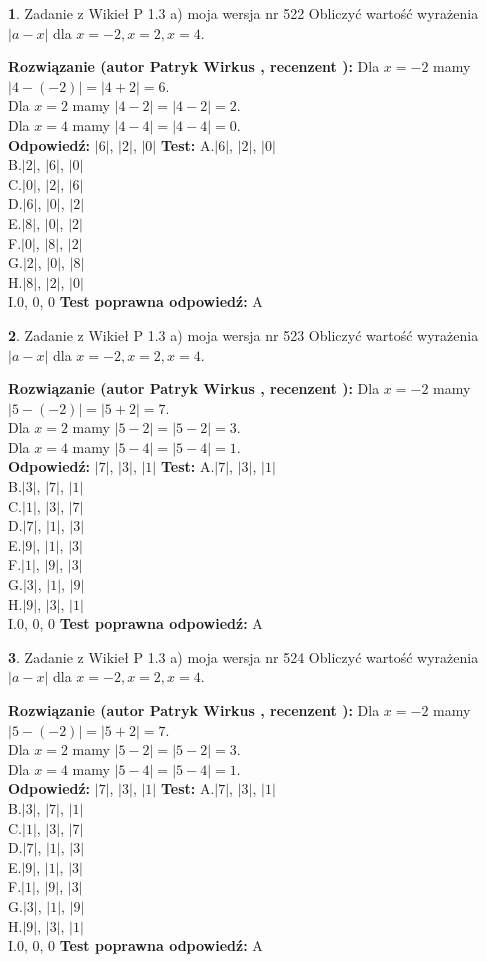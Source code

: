 \documentclass[12pt, a4paper]{article}
\theoremstyle{definition} %
\newtheorem{zad}{}
\newcommand{\zadStart}[1]{\begin{zad}#1\newline}
\newcommand{\zadStop}{\end{zad}}
\newcommand{\rozwStart}[2]{\noindent \textbf{Rozwiązanie (autor #1 , recenzent #2): }\newline}
\newcommand{\rozwStop}{\newline}
\newcommand{\odpStart}{\noindent \textbf{Odpowiedź:}\newline}
\newcommand{\odpStop}{\newline}
\newcommand{\testStart}{\noindent \textbf{Test:}\newline}
\newcommand{\testStop}{\newline}
\newcommand{\kluczStart}{\noindent \textbf{Test poprawna odpowiedź:}\newline}
\newcommand{\kluczStop}{\newline}
\begin{document}
\zadStart{Zadanie z Wikieł P 1.3 a) moja wersja nr 522}
Obliczyć wartość wyrażenia $|a - x|$ dla $x=-2,x=2,x=4$.
\zadStop
\rozwStart{Patryk Wirkus}{}
Dla $x = -2$ mamy $|4 - (-2)| = |4 + 2| = 6$.\\
Dla $x = 2$ mamy $|4 - 2| = |4 - 2| = 2$.\\
Dla $x = 4$ mamy $|4 - 4| = |4 - 4| = 0$.\\
\rozwStop
\odpStart
$|6|$, $|2|$, $|0|$
\odpStop
\testStart
A.$|6|$, $|2|$, $|0|$\\
B.$|2|$, $|6|$, $|0|$\\
C.$|0|$, $|2|$, $|6|$\\
D.$|6|$, $|0|$, $|2|$\\
E.$|8|$, $|0|$, $|2|$\\
F.$|0|$, $|8|$, $|2|$\\
G.$|2|$, $|0|$, $|8|$\\
H.$|8|$, $|2|$, $|0|$\\
I.$0$, $0$, $0$
\testStop
\kluczStart
A
\kluczStop



\zadStart{Zadanie z Wikieł P 1.3 a) moja wersja nr 523}
Obliczyć wartość wyrażenia $|a - x|$ dla $x=-2,x=2,x=4$.
\zadStop
\rozwStart{Patryk Wirkus}{}
Dla $x = -2$ mamy $|5 - (-2)| = |5 + 2| = 7$.\\
Dla $x = 2$ mamy $|5 - 2| = |5 - 2| = 3$.\\
Dla $x = 4$ mamy $|5 - 4| = |5 - 4| = 1$.\\
\rozwStop
\odpStart
$|7|$, $|3|$, $|1|$
\odpStop
\testStart
A.$|7|$, $|3|$, $|1|$\\
B.$|3|$, $|7|$, $|1|$\\
C.$|1|$, $|3|$, $|7|$\\
D.$|7|$, $|1|$, $|3|$\\
E.$|9|$, $|1|$, $|3|$\\
F.$|1|$, $|9|$, $|3|$\\
G.$|3|$, $|1|$, $|9|$\\
H.$|9|$, $|3|$, $|1|$\\
I.$0$, $0$, $0$
\testStop
\kluczStart
A
\kluczStop



\zadStart{Zadanie z Wikieł P 1.3 a) moja wersja nr 524}
Obliczyć wartość wyrażenia $|a - x|$ dla $x=-2,x=2,x=4$.
\zadStop
\rozwStart{Patryk Wirkus}{}
Dla $x = -2$ mamy $|5 - (-2)| = |5 + 2| = 7$.\\
Dla $x = 2$ mamy $|5 - 2| = |5 - 2| = 3$.\\
Dla $x = 4$ mamy $|5 - 4| = |5 - 4| = 1$.\\
\rozwStop
\odpStart
$|7|$, $|3|$, $|1|$
\odpStop
\testStart
A.$|7|$, $|3|$, $|1|$\\
B.$|3|$, $|7|$, $|1|$\\
C.$|1|$, $|3|$, $|7|$\\
D.$|7|$, $|1|$, $|3|$\\
E.$|9|$, $|1|$, $|3|$\\
F.$|1|$, $|9|$, $|3|$\\
G.$|3|$, $|1|$, $|9|$\\
H.$|9|$, $|3|$, $|1|$\\
I.$0$, $0$, $0$
\testStop
\kluczStart
A
\kluczStop
\end{document}

